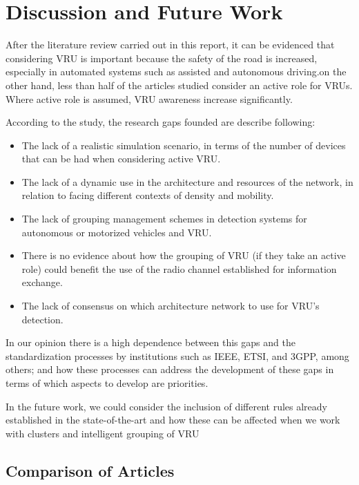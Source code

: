 \chapter{Discussion and Future Work}
After the literature review carried out in this report, it can be evidenced that considering VRU is important because the safety of the road is increased, especially in automated systems such as assisted and autonomous driving.on the other hand, less than half of the articles studied consider an active role for VRUs. Where active role is assumed, VRU awareness increase significantly.

According to the study, the research gaps founded are describe following:

\begin{itemize}
    \item The lack of a realistic simulation scenario, in terms of the number of devices that can be had when considering active VRU.    
    \item The lack of a dynamic use in the architecture and resources of the network, in relation to facing different contexts of density and mobility.    
    \item The lack of grouping management schemes in detection systems for autonomous or motorized vehicles and VRU. 
    \item There is no evidence about how the grouping of VRU (if they take an active role) could benefit the use of the radio channel established for information exchange. 
    \item The lack of consensus on which architecture network to use for VRU's detection.
\end{itemize}


In our opinion there is a high dependence between this gaps and the standardization processes by institutions such as IEEE, ETSI, and 3GPP, among others; and how these processes can address the development of these gaps in terms of which aspects to develop are priorities. 

In the future work, we could consider the inclusion of different rules already established in the state-of-the-art and how these can be affected when we work with clusters and intelligent grouping of VRU 


\section{Comparison of Articles}

